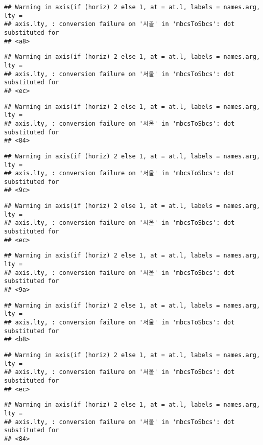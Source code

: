 \documentclass[
]{article}
\begin{document}
\begin{verbatim}
## Warning in axis(if (horiz) 2 else 1, at = at.l, labels = names.arg, lty =
## axis.lty, : conversion failure on '시골' in 'mbcsToSbcs': dot substituted for
## <a8>
\end{verbatim}

\begin{verbatim}
## Warning in axis(if (horiz) 2 else 1, at = at.l, labels = names.arg, lty =
## axis.lty, : conversion failure on '서울' in 'mbcsToSbcs': dot substituted for
## <ec>
\end{verbatim}

\begin{verbatim}
## Warning in axis(if (horiz) 2 else 1, at = at.l, labels = names.arg, lty =
## axis.lty, : conversion failure on '서울' in 'mbcsToSbcs': dot substituted for
## <84>
\end{verbatim}

\begin{verbatim}
## Warning in axis(if (horiz) 2 else 1, at = at.l, labels = names.arg, lty =
## axis.lty, : conversion failure on '서울' in 'mbcsToSbcs': dot substituted for
## <9c>
\end{verbatim}

\begin{verbatim}
## Warning in axis(if (horiz) 2 else 1, at = at.l, labels = names.arg, lty =
## axis.lty, : conversion failure on '서울' in 'mbcsToSbcs': dot substituted for
## <ec>
\end{verbatim}

\begin{verbatim}
## Warning in axis(if (horiz) 2 else 1, at = at.l, labels = names.arg, lty =
## axis.lty, : conversion failure on '서울' in 'mbcsToSbcs': dot substituted for
## <9a>
\end{verbatim}

\begin{verbatim}
## Warning in axis(if (horiz) 2 else 1, at = at.l, labels = names.arg, lty =
## axis.lty, : conversion failure on '서울' in 'mbcsToSbcs': dot substituted for
## <b8>
\end{verbatim}

\begin{verbatim}
## Warning in axis(if (horiz) 2 else 1, at = at.l, labels = names.arg, lty =
## axis.lty, : conversion failure on '서울' in 'mbcsToSbcs': dot substituted for
## <ec>
\end{verbatim}

\begin{verbatim}
## Warning in axis(if (horiz) 2 else 1, at = at.l, labels = names.arg, lty =
## axis.lty, : conversion failure on '서울' in 'mbcsToSbcs': dot substituted for
## <84>
\end{verbatim}
\end{document}

